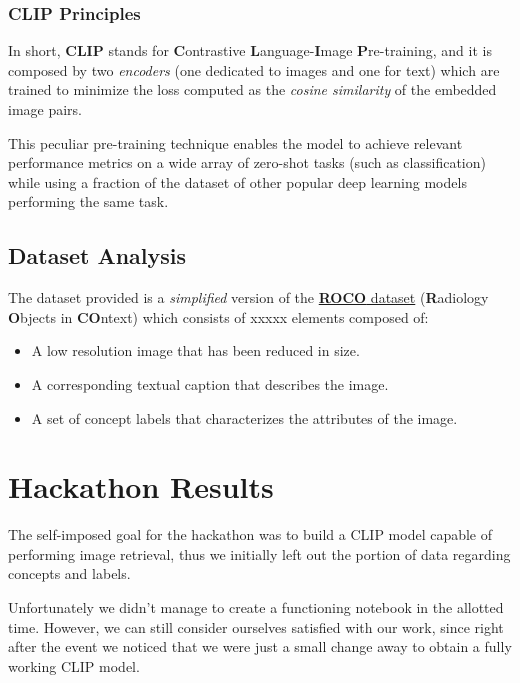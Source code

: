 \documentclass[12pt, a4paper]{article}
\begin{document}
\subsubsection*{CLIP Principles}
In short, \textbf{CLIP} stands for \textbf{C}ontrastive \textbf{L}anguage-\textbf{I}mage \textbf{P}re-training, and it is composed by two \textit{encoders} (one dedicated to images and one for text) which are trained to minimize the loss computed as the \textit{cosine similarity} of the embedded image pairs.

This peculiar pre-training technique enables the model to achieve relevant performance metrics on a wide array of zero-shot tasks (such as classification) while using a fraction of the dataset of other popular deep learning models performing the same task.

\subsection{Dataset Analysis}
The dataset provided is a \textit{simplified} version of the \href{https://link.springer.com/chapter/10.1007/978-3-030-01364-6_20}{\textbf{ROCO} dataset} (\textbf{R}adiology \textbf{O}bjects in \textbf{CO}ntext) which consists of xxxxx elements composed of:
\begin{itemize}
    \item A low resolution image that has been reduced in size.
    \item A corresponding textual caption that describes the image.
    \item A set of concept labels that characterizes the attributes of the image.
\end{itemize}


\section{Hackathon Results}
The self-imposed goal for the hackathon was to build a CLIP model capable of performing image retrieval, thus we initially left out the portion of data regarding concepts and labels.

Unfortunately we didn't manage to create a functioning notebook in the allotted time.
However, we can still consider ourselves satisfied with our work, since right after the event we noticed that we were just a small change away to obtain a fully working CLIP model.
\end{document}
